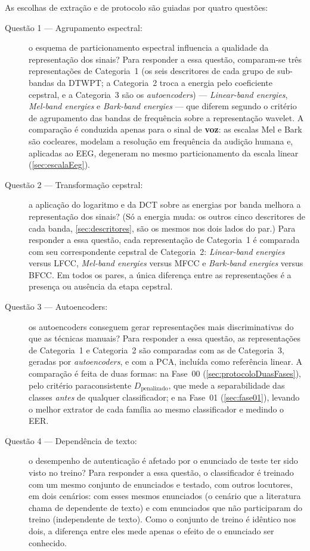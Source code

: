 		\par As escolhas de extração e de protocolo são guiadas por quatro questões:
		\begin{description}
				\item[Questão 1 --- Agrupamento espectral:] o esquema de particionamento espectral influencia a qualidade da representação dos sinais? Para responder a essa questão, comparam-se três representações de Categoria~1 (os seis descritores de cada grupo de sub-bandas da \ac{DTWPT}; a Categoria~2 troca a energia pelo coeficiente cepstral, e a Categoria~3 são os \textit{autoencoders}) --- \textit{Linear-band energies}, \textit{Mel-band energies} e \textit{Bark-band energies} --- que diferem segundo o critério de agrupamento das bandas de frequência sobre a representação wavelet. A comparação é conduzida apenas para o sinal de \textbf{voz}: as escalas Mel e Bark são cocleares, modelam a resolução em frequência da audição humana e, aplicadas ao EEG, degeneram no mesmo particionamento da escala linear (\autoref{sec:escalaEeg}).
				
				\item[Questão 2 --- Transformação cepstral:] a aplicação do logaritmo e da \ac{DCT} sobre as energias por banda melhora a representação dos sinais? (Só a energia muda: os outros cinco descritores de cada banda, \autoref{sec:descritores}, são os mesmos nos dois lados do par.) Para responder a essa questão, cada representação de Categoria~1 é comparada com seu correspondente cepstral de Categoria~2: \textit{Linear-band energies} versus \ac{LFCC}, \textit{Mel-band energies} versus \ac{MFCC} e \textit{Bark-band energies} versus \ac{BFCC}. Em todos os pares, a única diferença entre as representações é a presença ou ausência da etapa cepstral.
				
				\item[Questão 3 --- Autoencoders:] os autoencoders conseguem gerar representações mais discriminativas do que as técnicas manuais? Para responder a essa questão, as representações de Categoria~1 e Categoria~2 são comparadas com as de Categoria~3, geradas por \textit{autoencoders}, e com a \ac{PCA}, incluída como referência linear. A comparação é feita de duas formas: na Fase~00 (\autoref{sec:protocoloDuasFases}), pelo critério paraconsistente $D_{\text{penalizado}}$, que mede a separabilidade das classes \emph{antes} de qualquer classificador; e na Fase~01 (\autoref{sec:fase01}), levando o melhor extrator de cada família ao mesmo classificador e medindo o \ac{EER}.

				\item[Questão 4 --- Dependência de texto:] o desempenho de autenticação é afetado por o enunciado de teste ter sido visto no treino? Para responder a essa questão, o classificador é treinado com um mesmo conjunto de enunciados e testado, com outros locutores, em dois cenários: com esses mesmos enunciados (o cenário que a literatura chama de dependente de texto) e com enunciados que não participaram do treino (independente de texto). Como o conjunto de treino é idêntico nos dois, a diferença entre eles mede apenas o efeito de o enunciado ser conhecido.
			\end{description}

